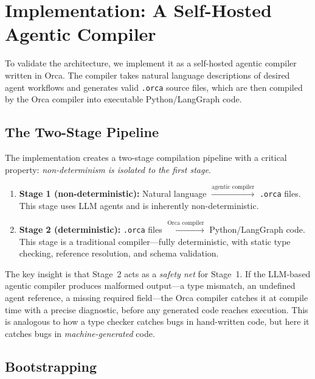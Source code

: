 \documentclass[sigconf,nonacm]{acmart}
\begin{document}
\section{Implementation: A Self-Hosted Agentic Compiler}
\label{sec:implementation}

To validate the architecture, we implement it as a self-hosted agentic
compiler written in Orca. The compiler takes natural language
descriptions of desired agent workflows and generates valid
\texttt{.orca} source files, which are then compiled by the Orca compiler
into executable Python/LangGraph code.

\subsection{The Two-Stage Pipeline}
\label{sec:impl:pipeline}

The implementation creates a two-stage compilation pipeline with a
critical property: \emph{non-determinism is isolated to the first
stage}.

\begin{enumerate}[leftmargin=*]
  \item \textbf{Stage 1 (non-deterministic):} Natural language
        $\xrightarrow{\text{agentic compiler}}$ \texttt{.orca} files.
        This stage uses LLM agents and is inherently non-deterministic.
  \item \textbf{Stage 2 (deterministic):} \texttt{.orca} files
        $\xrightarrow{\text{Orca compiler}}$ Python/LangGraph code.
        This stage is a traditional compiler---fully deterministic, with
        static type checking, reference resolution, and schema
        validation.
\end{enumerate}

The key insight is that Stage~2 acts as a \emph{safety net} for
Stage~1. If the LLM-based agentic compiler produces malformed output---a
type mismatch, an undefined agent reference, a missing required
field---the Orca compiler catches it at compile time with a precise
diagnostic, before any generated code reaches execution. This is
analogous to how a type checker catches bugs in hand-written code, but
here it catches bugs in \emph{machine-generated} code.

\subsection{Bootstrapping}
\label{sec:impl:bootstrapping}
\end{document}
